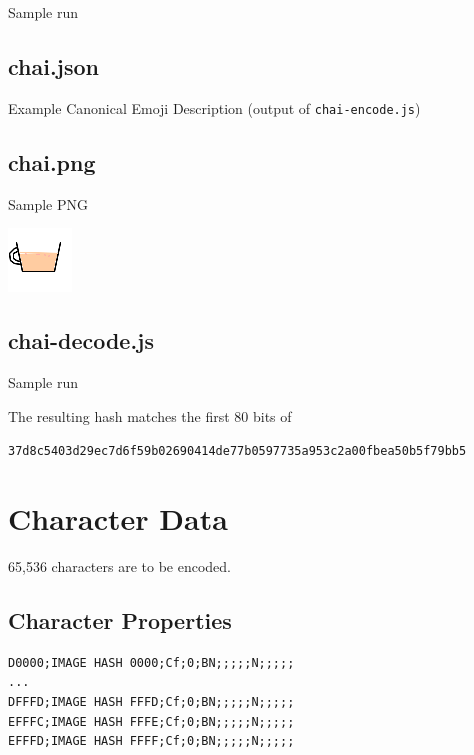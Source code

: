 \documentclass[12pt]{article}
\begin{document}
Sample run



\subsection{chai.json}

Example Canonical Emoji Description (output of \texttt{chai-encode.js})



\subsection{chai.png}

Sample PNG

\includegraphics{chai.png}

\subsection{chai-decode.js}



Sample run



The resulting hash matches the first 80 bits of 

\small{\texttt{37d8c5403d29ec7d6f59b02690414de77b0597735a953c2a00fbea50b5f79bb5}}

\section{Character Data}

65,536 characters are to be encoded.

\subsection{Character Properties}

\begin{verbatim}
D0000;IMAGE HASH 0000;Cf;0;BN;;;;;N;;;;;
...
DFFFD;IMAGE HASH FFFD;Cf;0;BN;;;;;N;;;;;
EFFFC;IMAGE HASH FFFE;Cf;0;BN;;;;;N;;;;;
EFFFD;IMAGE HASH FFFF;Cf;0;BN;;;;;N;;;;;
\end{verbatim}
\end{document}
